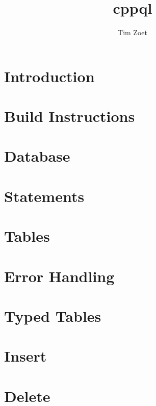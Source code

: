\documentclass[twoside,a4paper,smallborder=true]{refart}
\title{cppql}
\author{Tim Zoet}
\date{}
\begin{document}
\maketitle

\tableofcontents
\newpage

\section{Introduction}
\label{section:introduction}

\newpage

\section{Build Instructions}
\label{section:build}

\newpage

\section{Database}
\label{section:database}

\newpage

\section{Statements}
\label{section:statements}

\newpage

\section{Tables}
\label{section:tables}

\newpage

\section{Error Handling}
\label{section:errors}

\newpage

\section{Typed Tables}
\label{section:typed_tables}

\newpage

\section{Insert}
\label{section:insert}

\newpage

\section{Delete}
\label{section:delete}

\newpage
\end{document}
